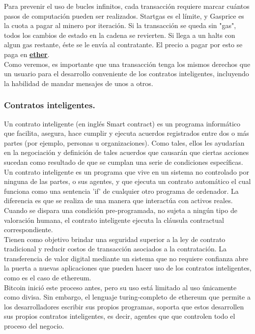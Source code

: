 \documentclass[11pt,a4paper]{article}
\begin{document}
Para prevenir el uso de bucles infinitos, cada transacción requiere marcar cuántos pasos de computación pueden ser realizados. Startgas es el límite, y Gasprice es la cuota a pagar al minero por iteración. Si la transacción se queda sin "gas", todos los cambios de estado en la cadena se revierten. Si llega a un halts con algun gas restante, éste se le envía al contratante. El precio a pagar por esto se paga en \hyperref[sec:ether]{\underline{\textbf{ether}}}.\\

Como veremos, es importante que una transacción tenga los mismos derechos que un usuario para el desarrollo conveniente de los contratos inteligentes, incluyendo la habilidad de mandar mensajes de unos a otros.\\


\subsubsection{Contratos inteligentes.}

Un contrato inteligente (en inglés Smart contract) es un programa informático que facilita, asegura, hace cumplir y ejecuta acuerdos registrados entre dos o más partes (por ejemplo, personas u organizaciones). Como tales, ellos les ayudarían en la negociación y definición de tales acuerdos que causarán que ciertas acciones sucedan como resultado de que se cumplan una serie de condiciones específicas.\\

Un contrato inteligente es un programa que vive en un sistema no controlado por ninguna de las partes, o sus agentes, y que ejecuta un contrato automático el cual funciona como una sentencia 'if' de cualquier otro programa de ordenador. La diferencia es que se realiza de una manera que interactúa con activos reales. Cuando se dispara una condición pre-programada, no sujeta a ningún tipo de valoración humana, el contrato inteligente ejecuta la cláusula contractual correspondiente.\\

Tienen como objetivo brindar una seguridad superior a la ley de contrato tradicional y reducir costos de transacción asociados a la contratación. La transferencia de valor digital mediante un sistema que no requiere confianza abre la puerta a nuevas aplicaciones que pueden hacer uso de los contratos inteligentes, como es el caso de ethereum.\\

Bitcoin inició este proceso antes, pero su uso está limitado al uso únicamente como divisa. Sin embargo, el lenguaje turing-completo de ethereum que permite a los desarrolladores escribir sus propios programas, soporta que estos desarrollen sus propios contratos inteligentes, es decir, agentes que que controlen todo el proceso del negocio.\\
\end{document}
